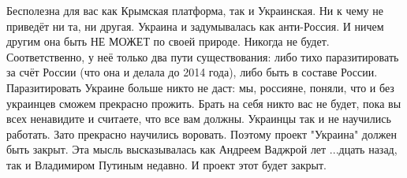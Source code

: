 \begin{itemize}
 

Бесполезна для вас как Крымская платформа, так и Украинская. Ни к чему не
приведёт ни та, ни другая. Украина и задумывалась как анти-Россия. И ничем
другим она быть НЕ МОЖЕТ по своей природе. Никогда не будет. Соответственно, у
неё только два пути существования: либо тихо паразитировать за счёт России (что
она и делала до 2014 года), либо быть в составе России. Паразитировать Украине
больше никто не даст: мы, россияне, поняли, что и без украинцев сможем
прекрасно прожить. Брать на себя никто вас не будет, пока вы всех ненавидите и
считаете, что все вам должны. Украинцы так и не научились работать. Зато
прекрасно научились воровать. Поэтому проект "Украина" должен быть закрыт. Эта
мысль высказывалась как Андреем Ваджрой лет ...дцать назад, так и Владимиром
Путиным недавно. И проект этот будет закрыт.

\end{itemize}

